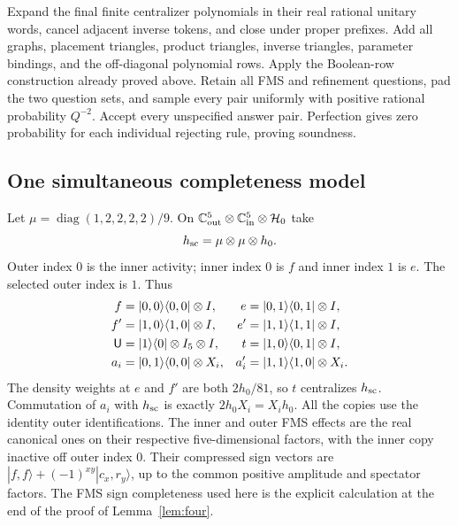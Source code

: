 Expand the final finite centralizer polynomials in their real rational
unitary words, cancel adjacent inverse tokens, and close under proper
prefixes.
Add all graphs, placement triangles, product triangles,
inverse triangles, parameter bindings, and the off-diagonal polynomial
rows. Apply the Boolean-row construction already proved above. Retain
all FMS and refinement questions, pad the two question sets, and sample
every pair uniformly with positive rational probability $Q^{-2}$.
Accept every unspecified answer pair. Perfection gives zero probability
for each individual rejecting rule, proving soundness.

\subsection{One simultaneous completeness model}
Let $\mu=\operatorname{diag}(1,2,2,2,2)/9$. On
$\mathbb C^5_{\rm out}\otimes\mathbb C^5_{\rm in}\otimes\mathcal H_0$ take
\begin{equation}
                     h_{\rm sc}=\mu\otimes\mu\otimes h_0.     \label{eq:nested-N9}
\end{equation}
Outer index $0$ is the inner activity; inner index $0$ is $f$ and
inner index $1$ is $e$. The selected outer index is $1$. Thus
\begin{align*}
 f&=|0,0\rangle\langle0,0|\otimes I,&
 e&=|0,1\rangle\langle0,1|\otimes I,\\
 f'&=|1,0\rangle\langle1,0|\otimes I,&
 e'&=|1,1\rangle\langle1,1|\otimes I,\\
 {\mathsf U}&=|1\rangle\langle0|\otimes I_5\otimes I,&
 t&=|1,0\rangle\langle0,1|\otimes I,\\
 a_i&=|0,1\rangle\langle0,0|\otimes X_i,&
 a_i'&=|1,1\rangle\langle1,0|\otimes X_i.
\end{align*}
The density weights at $e$ and $f'$ are both $2h_0/81$, so $t$
centralizes $h_{\rm sc}$. Commutation of $a_i$ with $h_{\rm sc}$ is
exactly $2h_0X_i=X_ih_0$. All the copies use the identity outer
identifications. The inner and outer FMS effects are the real canonical
ones on their respective five-dimensional factors, with the inner
copy inactive off outer index $0$. Their compressed sign vectors are
$|f,f\rangle+(-1)^{xy}|c_x,r_y\rangle$, up to the common positive
amplitude and spectator factors. The FMS sign completeness used here
is the explicit calculation at the end of the proof of
Lemma~\ref{lem:four}.

